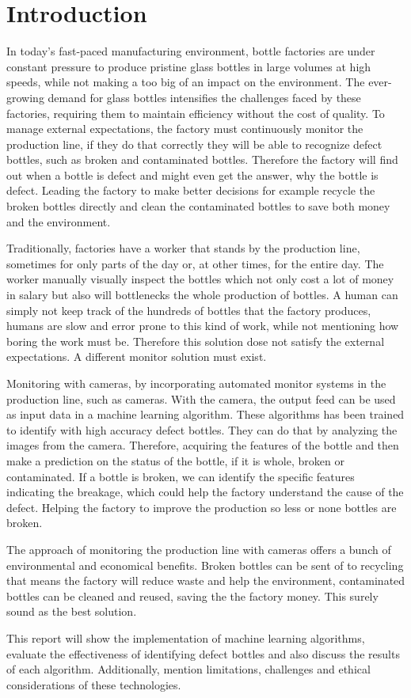 \section{Introduction}

In today’s fast-paced manufacturing environment, bottle factories are under constant pressure to produce pristine glass bottles in large volumes at high speeds, while not making a too big of an impact on the environment. The ever-growing demand for glass bottles \cite{ReturnableBottles} intensifies the challenges faced by these factories, requiring them to maintain efficiency without the cost of quality.  To manage external expectations, the factory must continuously monitor the production line, if they do that correctly they will be able to recognize defect bottles, such as broken and contaminated bottles. Therefore the factory will find out when a bottle is defect and might even get the answer, why the bottle is defect. Leading the factory to make better decisions for example recycle the broken bottles directly and clean the contaminated bottles to save both money and the environment.
\par
Traditionally, factories have a worker that stands by the production line, sometimes for only parts of the day or, at other times, for the entire day. The worker manually visually inspect the bottles which not only cost a lot of money in salary but also will bottlenecks the whole production of bottles. A human can simply not keep track of the hundreds of bottles that the factory produces, humans are slow and error prone to this kind of work, while not mentioning how boring the work must be. Therefore this solution dose not satisfy the external expectations.  A different monitor solution must exist.
\par
Monitoring with cameras, by incorporating automated monitor systems in the production line, such as cameras. 
With the camera, the output feed can be used as input data in a machine learning algorithm. 
These algorithms has been trained to identify with high accuracy defect bottles. 
They can do that by analyzing the images from the camera. Therefore, acquiring the features of the bottle and then make a prediction on the status of the bottle, if it is whole, broken or contaminated.
If a bottle is broken, we can identify the specific features indicating the breakage, which could help the factory understand the cause of the defect.
Helping the factory to improve the production so less or none bottles are broken. 
\par
The approach of monitoring the production line with cameras offers a bunch of environmental and economical benefits. Broken bottles can be sent of to recycling that means the factory will reduce waste and help the environment, contaminated bottles can be cleaned and reused, saving the the factory  money. This surely sound as the best solution.
\par
This report will show the implementation of machine learning algorithms, evaluate the effectiveness of identifying defect bottles and also discuss the results of each algorithm. Additionally, mention limitations, challenges and ethical considerations of these technologies.
